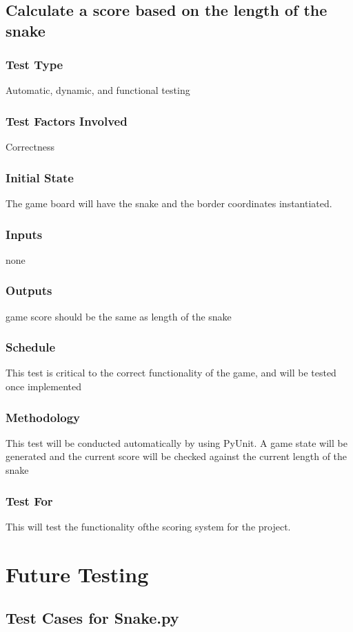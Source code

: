 \documentclass[12pt]{article}
\begin{document}
\noindent
\subsection{Calculate a score based on the length of the snake}
\subsubsection*{Test Type}
Automatic, dynamic, and functional testing
\subsubsection*{Test Factors Involved}
Correctness
\subsubsection*{Initial State}
The game board will have the snake and the border coordinates instantiated.
\subsubsection*{Inputs}
none
\subsubsection*{Outputs}
game score should be the same as length of the snake
\subsubsection*{Schedule}
This test is critical to the correct functionality of the game, and will be tested once implemented
\subsubsection*{Methodology}
This test will be conducted automatically by using PyUnit. A game state will be generated and the current score will be checked against the current length of the snake
\subsubsection*{Test For}
This will test the functionality ofthe scoring system for the project. \newline


\section{Future Testing}
\subsection{Test Cases for Snake.py}
\end{document}
